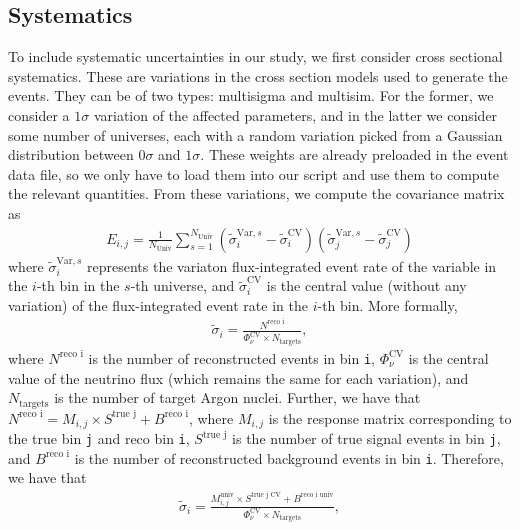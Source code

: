 \documentclass{article}
\begin{document}
\clearpage

\subsection{Systematics}

To include systematic uncertainties in our study, we first consider cross sectional systematics.
These are variations in the cross section models used to generate the events. They can be of two types:
multisigma and multisim. For the former, we consider a $1\sigma$ variation of the affected parameters, 
and in the latter we consider some number of universes, each with a random variation picked from a 
Gaussian distribution between $0\sigma$ and $1\sigma$. These weights are already preloaded in the event data file,
so we only have to load them into our script and use them to compute the relevant quantities.
From these variations, we compute the covariance matrix as 
\begin{align}
    E_{i,j} = \frac{1}{N_{\text{Univ}}} \sum_{s = 1}^{N_{\text{Univ}}} (\tilde{\sigma}_i^{\text{Var}, s} - \tilde{\sigma}_i^\text{CV})(\tilde{\sigma}_j^{\text{Var}, s} - \tilde{\sigma}_j^\text{CV})
\end{align}
where $\tilde{\sigma}_i^{\text{Var}, s}$ represents the variaton flux-integrated event rate of the variable in the $i$-th 
bin in the $s$-th universe, and $\tilde{\sigma}_i^\text{CV}$ is the central value (without any variation) 
of the flux-integrated event rate in the $i$-th bin. More formally,
\begin{align}
    \tilde{\sigma}_i = \frac{N^\text{reco i}}{\Phi_\nu^\text{CV} \times N_{\text{targets}}},
\end{align}
where $N^\text{reco i}$ is the number of reconstructed events in bin \verb|i|, 
$\Phi_\nu^\text{CV}$ is the central value of the neutrino flux (which remains the same for each variation),
and $N_{\text{targets}}$ is the number of target Argon nuclei. Further, we have that 
$N^\text{reco i} = M_{i,j} \times S^{\text{true j}} + B^{\text{reco i}}$, 
where $M_{i,j}$ is the response matrix corresponding to the true bin \verb|j| and reco 
bin \verb|i|, $S^{\text{true j}}$ is the number of true signal events in bin \verb|j|, and
$B^{\text{reco i}}$ is the number of reconstructed background events in bin \verb|i|. Therefore, we 
have that 
\begin{align}
    \tilde{\sigma}_i = \frac{M^{\text{univ}}_{i,j} \times S^{\text{true j CV}} + B^{\text{reco i univ}}}{\Phi_\nu^\text{CV} \times N_{\text{targets}}},
\end{align}
\end{document}
